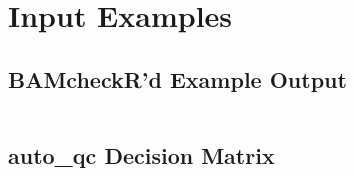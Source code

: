 \chapter{Input Examples}

\section{BAMcheckR'd Example Output}
\label{app:bamcheckr}
\inputminted[fontsize=\scriptsize]{text}{Appendix1/example.bamcheck.SN.txt}

\section{auto\_qc Decision Matrix}
\label{app:aqc_matrix}
\inputminted[fontsize=\scriptsize]{text}{Appendix1/example.aqc.txt}
